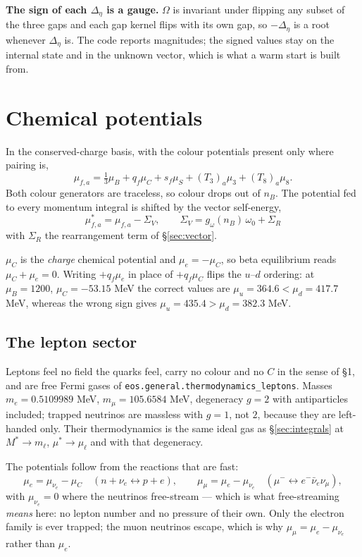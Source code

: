 \documentclass[11pt,a4paper]{article}
\newcommand{\Mstar}{M^{*}}
\newcommand{\mustar}{\mu^{*}}
\newcommand{\code}[1]{\texttt{#1}}
\begin{document}
\textbf{The sign of each $\Delta_\eta$ is a gauge.} $\Omega$ is invariant under
flipping any subset of the three gaps and each gap kernel flips with its own
gap, so $-\Delta_\eta$ is a root whenever $\Delta_\eta$ is. The code reports
magnitudes; the signed values stay on the internal state and in the unknown
vector, which is what a warm start is built from.

\section{Chemical potentials}
\label{sec:mu}

In the conserved-charge basis, with the colour potentials present only where
pairing is,
\begin{equation}
\mu_{f,a} = \tfrac13\mu_B + q_f\mu_C + s_f\mu_S + (T_3)_a\mu_3 + (T_8)_a\mu_8 .
\label{eq:mu}
\end{equation}
Both colour generators are traceless, so colour drops out of $n_B$. The
potential fed to every momentum integral is shifted by the vector self-energy,
\begin{equation}
\boxed{\;\mustar_{f,a} = \mu_{f,a} - \Sigma_V,
\qquad \Sigma_V = g_\omega(n_B)\,\omega_0 + \Sigma_R\;}
\label{eq:mustar}
\end{equation}
with $\Sigma_R$ the rearrangement term of \S\ref{sec:vector}.

$\mu_C$ is the \emph{charge} chemical potential and $\mu_e=-\mu_C$, so beta
equilibrium reads $\mu_C+\mu_e=0$. Writing $+q_f\mu_e$ in place of $+q_f\mu_C$
flips the $u$--$d$ ordering: at $\mu_B=1200$, $\mu_C=-53.15$ MeV the correct
values are $\mu_u=364.6<\mu_d=417.7$ MeV, whereas the wrong sign gives
$\mu_u=435.4>\mu_d=382.3$ MeV.

\subsection{The lepton sector}
\label{sec:leptons}

Leptons feel no field the quarks feel, carry no colour and no $C$ in the sense
of \S1, and are free Fermi gases of \code{eos.general.thermodynamics\_leptons}.
Masses $m_e=0.5109989$ MeV, $m_\mu=105.6584$ MeV, degeneracy $g=2$ with
antiparticles included; trapped neutrinos are massless with $g=1$, not $2$,
because they are left-handed only. Their thermodynamics is the same ideal gas
as \S\ref{sec:integrals} at $\Mstar\to m_\ell$, $\mustar\to\mu_\ell$ and with
that degeneracy.

The potentials follow from the reactions that are fast:
\begin{equation}
\mu_e = \mu_{\nu_e} - \mu_C \quad (n+\nu_e\leftrightarrow p+e),
\qquad
\mu_\mu = \mu_e - \mu_{\nu_e} \quad (\mu^-\leftrightarrow e^-\bar\nu_e\nu_\mu),
\label{eq:leptonmu}
\end{equation}
with $\mu_{\nu_e}=0$ where the neutrinos free-stream --- which is what
free-streaming \emph{means} here: no lepton number and no pressure of their
own. Only the electron family is ever trapped; the muon neutrinos escape,
which is why $\mu_\mu = \mu_e - \mu_{\nu_e}$ rather than $\mu_e$.
\end{document}
